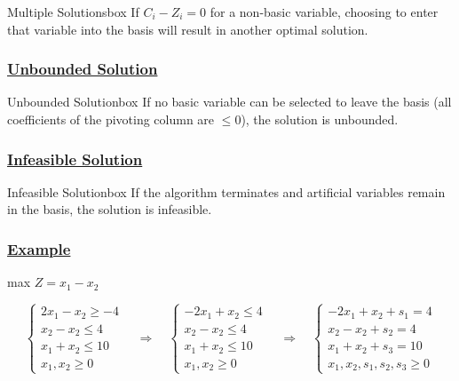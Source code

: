 \begin{prettyBox}{Multiple Solutions}{box}
If \(C_i - Z_i = 0\) for a non-basic variable, choosing to enter that variable into the basis will result in another optimal solution. 
\end{prettyBox}

\vspace{0.25cm}
\subsubsection*{\underline{Unbounded Solution}}

\begin{prettyBox}{Unbounded Solution}{box}
If no basic variable can be selected to leave the basis (all coefficients of the pivoting column are \(\leq 0\)), the solution is unbounded. 
\end{prettyBox}

\vspace{0.25cm}
\subsubsection*{\underline{Infeasible Solution}}

\begin{prettyBox}{Infeasible Solution}{box}
If the algorithm terminates and artificial variables remain in the basis, the solution is infeasible. 
\end{prettyBox}

\newpage
\subsubsection*{\underline{Example}}

max \(Z = x_1 - x_2\)

\[
\left\{
\begin{array}{l}
    2x_{1} - x_{2} \geq -4 \\
    x_{2}-x_{2} \leq 4 \\
    x_{1} + x_{2} \leq 10 \\
    x_{1}, x_{2}\geq 0
\end{array}
\right.
\quad
\Longrightarrow
\quad
\left\{
\begin{array}{l}
    -2x_{1} + x_{2} \leq 4 \\
    x_{2}-x_{2} \leq 4 \\
    x_{1} + x_{2} \leq 10 \\
    x_{1}, x_{2} \geq 0
\end{array}
\right.
\quad
\Longrightarrow
\quad
\left\{
\begin{array}{l}
    -2x_{1} + x_{2} + s_{1} = 4 \\
    x_{2}-x_{2} + s_{2} = 4 \\
    x_{1} + x_{2} + s_{3} = 10 \\
    x_{1}, x_{2}, s_{1}, s_{2}, s_{3}\geq 0
\end{array}
\right.
\]


